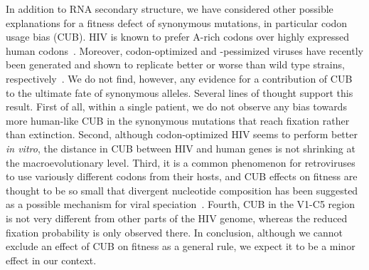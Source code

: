 \documentclass[rmp, twocolumn]{revtex4}
\begin{document}
In addition to RNA secondary structure, we have considered other possible
explanations for a fitness defect of synonymous mutations, in particular codon
usage bias (CUB). HIV is known to prefer A-rich codons over highly expressed
human codons~\citep{jenkins_extent_2003}. Moreover, codon-optimized
and -pessimized viruses have recently been generated and shown to replicate
better or worse than wild type strains,
respectively~\citep{li_codon-usage-based_2012, ngumbela_quantitative_2008,
coleman_virus_2008}. We do not find, however, any evidence for a contribution of
CUB to the ultimate fate of synonymous alleles. Several lines of thought support
this result. First of all, within a single patient, we do not observe any bias
towards more human-like CUB in the synonymous mutations that reach fixation
rather than extinction. Second, although codon-optimized HIV seems to perform
better {\it in vitro}, the distance in CUB between HIV and human genes is not
shrinking at the macroevolutionary level. Third, it is a common phenomenon for
retroviruses to use variously different codons from their hosts, and CUB effects
on fitness are thought to be so small that divergent nucleotide composition has
been suggested as a possible mechanism for viral
speciation~\citep{bronson_nucleotide_1994}. Fourth, CUB in the V1-C5 region is
not very different from other parts of the HIV genome, whereas the reduced
fixation probability is only observed there. In conclusion, although we cannot
exclude an effect of CUB on fitness as a general rule, we expect it to be a
minor effect in our context.
\end{document}
